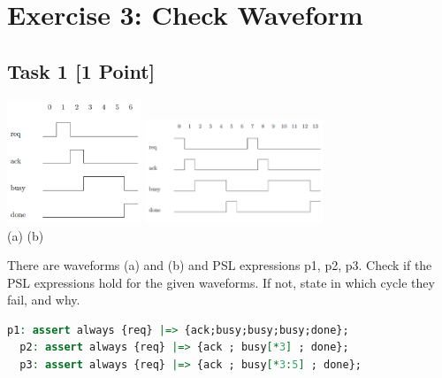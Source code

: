 \documentclass[12pt,epsf,makeidx,oneside]{book}
\begin{document}
\section{Exercise 3: Check Waveform}

\subsection{Task 1 [1 Point]}
\begin{center}
  \includegraphics[width=0.3\textwidth]{ex3_1a} \vspace*{0.5cm}
  \includegraphics[width=0.4\textwidth]{ex3_1b} \\
  (a) \hspace*{5cm}(b)
\end{center}
There are waveforms (a) and (b) and PSL expressions p1, p2, p3. Check if the PSL expressions hold for the given waveforms. If not, state in which cycle they fail, and why.
\begin{lstlisting}[gobble=2,language=vhdl]
  p1: assert always {req} |=> {ack;busy;busy;busy;done};
  p2: assert always {req} |=> {ack ; busy[*3] ; done}; 
  p3: assert always {req} |=> {ack ; busy[*3:5] ; done};
\end{lstlisting}
\end{document}
